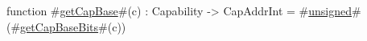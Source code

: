 function #\hyperref[sailRISCVzgetCapBase]{getCapBase}#(c) : Capability -> CapAddrInt =
    #\hyperref[sailRISCVzunsigned]{unsigned}#(#\hyperref[sailRISCVzgetCapBaseBits]{getCapBaseBits}#(c))
